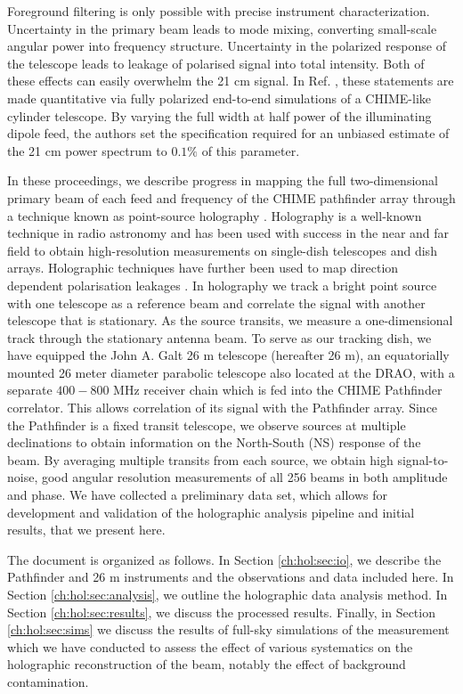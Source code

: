 Foreground filtering is only possible with precise instrument characterization. Uncertainty in the primary beam leads to mode mixing, converting small-scale angular power into frequency structure. Uncertainty in the polarized response of the telescope leads to leakage of polarised signal into total intensity. Both of these effects can easily overwhelm the 21 cm signal. In Ref. \citep{mmodes2}, these statements are made quantitative via fully polarized end-to-end simulations of a CHIME-like cylinder telescope. By varying the full width at half power of the illuminating dipole feed, the authors set the specification required for an unbiased estimate of the 21 cm power spectrum to $0.1\%$ of this parameter.

In these proceedings, we describe progress in mapping the full two-dimensional primary beam of each feed and frequency of the CHIME pathfinder array through a technique known as point-source holography \citep{radio1, radio2}. Holography is a well-known technique in radio astronomy and has been used with success in the near \citep{hol1} and far field \citep{hol2} to obtain high-resolution measurements on single-dish telescopes and dish arrays. Holographic techniques have further been used to map direction dependent polarisation leakages \citep{holpol}. In holography we track a bright point source with one telescope as a reference beam and correlate the signal with another telescope that is stationary. As the source transits, we measure a one-dimensional track through the stationary antenna beam. To serve as our tracking dish, we have equipped the John A. Galt 26 m telescope\citep{wolleben1, wolleben2} (hereafter 26 m), an equatorially mounted 26 meter diameter parabolic telescope also located at the DRAO, with a separate $400-800$ MHz receiver chain which is fed into the CHIME Pathfinder correlator. This allows correlation of its signal with the Pathfinder array. Since the Pathfinder is a fixed transit telescope, we observe sources at multiple declinations to obtain information on the North-South (NS) response of the beam. By averaging multiple transits from each source, we obtain high signal-to-noise, good angular resolution measurements of all 256 beams in both amplitude and phase. We have collected a preliminary data set, which allows for development and validation of the holographic analysis pipeline and initial results, that we present here.

The document is organized as follows. In Section \ref{ch:hol:sec:io}, we describe the Pathfinder and 26 m instruments and the observations and data included here. In Section \ref{ch:hol:sec:analysis}, we outline the holographic data analysis method. In Section \ref{ch:hol:sec:results}, we discuss the processed results. Finally, in Section \ref{ch:hol:sec:sims} we discuss the results of full-sky simulations of the measurement which we have conducted to assess the effect of various systematics on the holographic reconstruction of the beam, notably the effect of background contamination.


